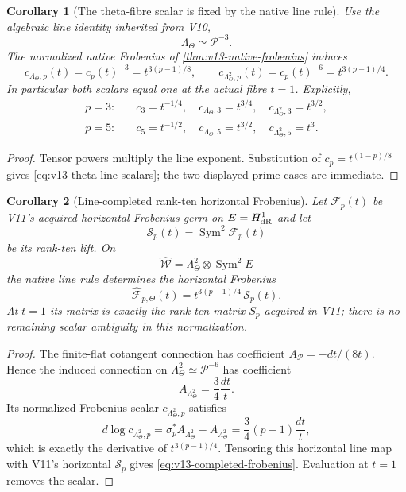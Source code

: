 \documentclass[11pt]{article}
\newtheorem{corollary}[corollary]{Corollary}
\theoremstyle{definition}
\theoremstyle{remark}
\begin{document}
\begin{corollary}[The theta-fibre scalar is fixed by the native line rule]
\label{cor:v13-theta-line-frobenius}
Use the algebraic line identity inherited from V10,
\[
 \Lambda_\Theta\simeq\mathscr P^{-3}.
\]
The normalized native Frobenius of \cref{thm:v13-native-frobenius} induces
\begin{equation}
 \boxed{
 c_{\Lambda_\Theta,p}(t)=c_p(t)^{-3}=t^{3(p-1)/8},
 \qquad
 c_{\Lambda_\Theta^2,p}(t)=c_p(t)^{-6}=t^{3(p-1)/4}.
 }
 \label{eq:v13-theta-line-scalars}
\end{equation}
In particular both scalars equal one at the actual fibre $t=1$.  Explicitly,
\begin{align*}
 p=3:&\quad c_3=t^{-1/4},\quad
 c_{\Lambda_\Theta,3}=t^{3/4},\quad
 c_{\Lambda_\Theta^2,3}=t^{3/2},\\
 p=5:&\quad c_5=t^{-1/2},\quad
 c_{\Lambda_\Theta,5}=t^{3/2},\quad
 c_{\Lambda_\Theta^2,5}=t^3.
\end{align*}
\end{corollary}

\begin{proof}
Tensor powers multiply the line exponent.  Substitution of
$c_p=t^{(1-p)/8}$ gives \cref{eq:v13-theta-line-scalars}; the two displayed
prime cases are immediate.
\end{proof}

\begin{corollary}[Line-completed rank-ten horizontal Frobenius]
\label{cor:v13-rank10-completion}
Let $\mathcal F_p(t)$ be V11's acquired horizontal Frobenius germ on
$E=H^1_{\rm dR}$ and let
\[
 \mathcal S_p(t)=\operatorname{Sym}^2\mathcal F_p(t)
\]
be its rank-ten lift.  On
\[
 \widehat{\mathcal W}
 =\Lambda_\Theta^2\otimes\operatorname{Sym}^2E
\]
the native line rule determines the horizontal Frobenius
\begin{equation}
 \boxed{
 \widehat{\mathcal F}_{p,\Theta}(t)
 =t^{3(p-1)/4}\,\mathcal S_p(t).
 }
 \label{eq:v13-completed-frobenius}
\end{equation}
At $t=1$ its matrix is exactly the rank-ten matrix $S_p$ acquired in V11;
there is no remaining scalar ambiguity in this normalization.
\end{corollary}

\begin{proof}
The finite-flat cotangent connection has coefficient
$A_{\mathscr P}=-dt/(8t)$.  Hence the induced connection on
$\Lambda_\Theta^2\simeq\mathscr P^{-6}$ has coefficient
\[
 A_{\Lambda_\Theta^2}=\frac34\frac{dt}{t}.
\]
Its normalized Frobenius scalar $c_{\Lambda_\Theta^2,p}$ satisfies
\[
 d\log c_{\Lambda_\Theta^2,p}
 =\sigma_p^*A_{\Lambda_\Theta^2}-A_{\Lambda_\Theta^2}
 =\frac34(p-1)\frac{dt}{t},
\]
which is exactly the derivative of $t^{3(p-1)/4}$.  Tensoring this horizontal
line map with V11's horizontal $\mathcal S_p$ gives
\cref{eq:v13-completed-frobenius}.  Evaluation at $t=1$ removes the scalar.
\end{proof}
\end{document}
